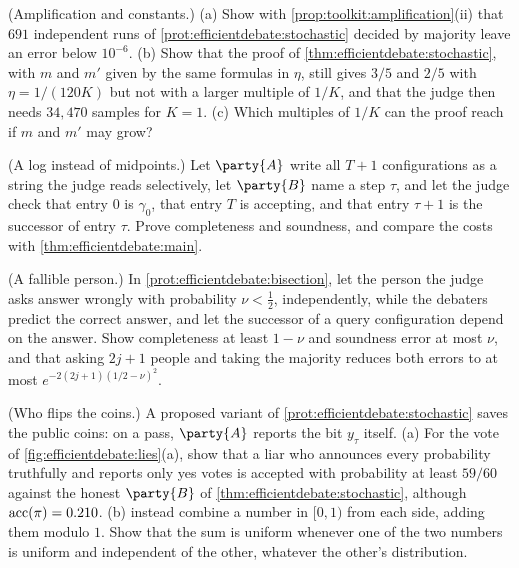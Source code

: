 \begin{refsection}
\begin{exercises}
\item \consolidation (Amplification and constants.) (a) Show with \cref{prop:toolkit:amplification}(ii) that $691$ independent runs of \cref{prot:efficientdebate:stochastic} decided by majority leave an error below $10^{-6}$. (b) Show that the proof of \cref{thm:efficientdebate:stochastic}, with $m$ and $m'$ given by the same formulas in $\eta$, still gives $3/5$ and $2/5$ with $\eta=1/(120K)$ but not with a larger multiple of $1/K$, and that the judge then needs $34{,}470$ samples for $K=1$. (c) Which multiples of $1/K$ can the proof reach if $m$ and $m'$ may grow?\label{ex:efficientdebate:constants}

\item \variation (A log instead of midpoints.) Let $\party{A}$ write all $T+1$ configurations as a string the judge reads selectively, let $\party{B}$ name a step $\tau$, and let the judge check that entry $0$ is $\gamma_0$, that entry $T$ is accepting, and that entry $\tau+1$ is the successor of entry $\tau$. Prove completeness and soundness, and compare the costs with \cref{thm:efficientdebate:main}.\label{ex:efficientdebate:log}

\item \variation (A fallible person.) In \cref{prot:efficientdebate:bisection}, let the person the judge asks answer wrongly with probability $\nu<\frac12$, independently, while the debaters predict the correct answer, and let the successor of a query configuration depend on the answer. Show completeness at least $1-\nu$ and soundness error at most $\nu$, and that asking $2j+1$ people and taking the majority reduces both errors to at most $e^{-2(2j+1)(1/2-\nu)^2}$.\label{ex:efficientdebate:fallible}

\item \attack (Who flips the coins.) A proposed variant of \cref{prot:efficientdebate:stochastic} saves the public coins: on a pass, $\party{A}$ reports the bit $y_\tau$ itself. (a) For the vote of \cref{fig:efficientdebate:lies}(a), show that a liar who announces every probability truthfully and reports only yes votes is accepted with probability at least $59/60$ against the honest $\party{B}$ of \cref{thm:efficientdebate:stochastic}, although $\operatorname{acc}(\pi)=0.210$. (b) \Textcite{BrownCohenEtAl2024} instead combine a number in $[0,1)$ from each side, adding them modulo $1$. Show that the sum is uniform whenever one of the two numbers is uniform and independent of the other, whatever the other's distribution.\label{ex:efficientdebate:coins}


\end{exercises}
\end{refsection}
